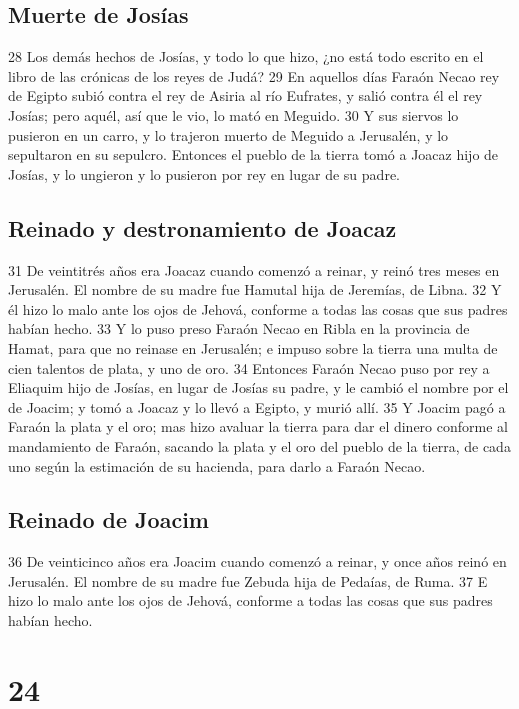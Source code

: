 \section*{Muerte de Josías}

28 Los demás hechos de Josías, y todo lo que hizo, ¿no está todo escrito en el libro de las crónicas de los reyes de Judá?
29 En aquellos días Faraón Necao rey de Egipto subió contra el rey de Asiria al río Eufrates, y salió contra él el rey Josías; pero aquél, así que le vio, lo mató en Meguido.
30 Y sus siervos lo pusieron en un carro, y lo trajeron muerto de Meguido a Jerusalén, y lo sepultaron en su sepulcro. Entonces el pueblo de la tierra tomó a Joacaz hijo de Josías, y lo ungieron y lo pusieron por rey en lugar de su padre.

\section*{Reinado y destronamiento de Joacaz}

31 De veintitrés años era Joacaz cuando comenzó a reinar, y reinó tres meses en Jerusalén. El nombre de su madre fue Hamutal hija de Jeremías, de Libna.
32 Y él hizo lo malo ante los ojos de Jehová, conforme a todas las cosas que sus padres habían hecho.
33 Y lo puso preso Faraón Necao en Ribla en la provincia de Hamat, para que no reinase en Jerusalén; e impuso sobre la tierra una multa de cien talentos de plata,  y uno de oro.
34 Entonces Faraón Necao puso por rey a Eliaquim hijo de Josías, en lugar de Josías su padre, y le cambió el nombre por el de Joacim; y tomó a Joacaz y lo llevó a Egipto, y murió allí. 
35 Y Joacim pagó a Faraón la plata y el oro; mas hizo avaluar la tierra para dar el dinero conforme al mandamiento de Faraón, sacando la plata y el oro del pueblo de la tierra, de cada uno según la estimación de su hacienda, para darlo a Faraón Necao.

\section*{Reinado de Joacim}

36 De veinticinco años era Joacim cuando comenzó a reinar, y once años reinó en Jerusalén. El nombre de su madre fue Zebuda hija de Pedaías, de Ruma.
37 E hizo lo malo ante los ojos de Jehová, conforme a todas las cosas que sus padres habían hecho.

\chapter{24}

